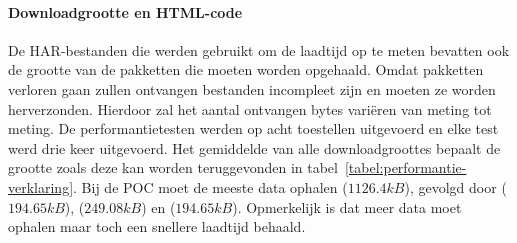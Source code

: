 \paragraph{Downloadgrootte en HTML-code}
De HAR-bestanden die werden gebruikt om de laadtijd op te meten bevatten ook de grootte van de pakketten die moeten worden opgehaald.
Omdat pakketten verloren gaan zullen ontvangen bestanden incompleet zijn en moeten ze worden herverzonden. %
Hierdoor zal het aantal ontvangen bytes variëren van meting tot meting.
De performantietesten werden op acht toestellen uitgevoerd en elke test werd drie keer uitgevoerd.
Het gemiddelde van alle downloadgroottes bepaalt de grootte zoals deze kan worden teruggevonden in tabel~\ref{tabel:performantie-verklaring}.
Bij de POC moet \st{} de meeste data ophalen ($1126.4kB$),  gevolgd door \kendo{} ($194.65kB$), \lungo{} ($249.08kB$) en \jqm{} ($194.65kB$).
Opmerkelijk is dat \lungo{} meer data moet ophalen maar toch een snellere laadtijd behaald.


\begin{table}[H]
\centering
{}
\caption{Metrieken gebruikt bij de verklaring van performantiecriterium voor \st{}~(\sta), \kendo{}~(\kendoa), \jqm{}~(\jqma) en \lungo{}~(\lungoa).}
\label{tabel:performantie-verklaring}
\end{table}


